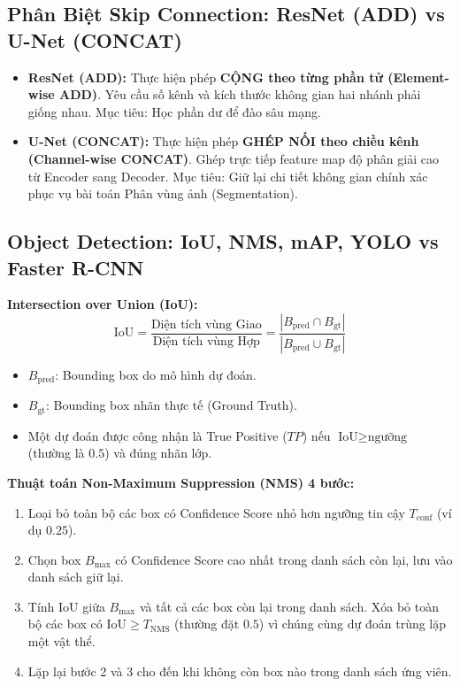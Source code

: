 \documentclass[10pt,a4paper]{article}
\begin{document}
\subsection{Phân Biệt Skip Connection: ResNet (ADD) vs U-Net (CONCAT)}
\begin{itemize}[leftmargin=*]
    \item \textbf{ResNet (ADD):} Thực hiện phép \textbf{CỘNG theo từng phần tử (Element-wise ADD)}. Yêu cầu số kênh và kích thước không gian hai nhánh phải giống nhau. Mục tiêu: Học phần dư để đào sâu mạng.
    \item \textbf{U-Net (CONCAT):} Thực hiện phép \textbf{GHÉP NỐI theo chiều kênh (Channel-wise CONCAT)}. Ghép trực tiếp feature map độ phân giải cao từ Encoder sang Decoder. Mục tiêu: Giữ lại chi tiết không gian chính xác phục vụ bài toán Phân vùng ảnh (Segmentation).
\end{itemize}

\subsection{Object Detection: IoU, NMS, mAP, YOLO vs Faster R-CNN}
\textbf{Intersection over Union (IoU):}
\begin{equation}
    \text{IoU} = \frac{\text{Diện tích vùng Giao}}{\text{Diện tích vùng Hợp}} = \frac{|B_{\text{pred}} \cap B_{\text{gt}}|}{|B_{\text{pred}} \cup B_{\text{gt}}|}
\end{equation}
\begin{itemize}[leftmargin=*]
    \item $B_{\text{pred}}$: Bounding box do mô hình dự đoán.
    \item $B_{\text{gt}}$: Bounding box nhãn thực tế (Ground Truth).
    \item Một dự đoán được công nhận là True Positive ($TP$) nếu $\text{IoU} \ge \text{ngưỡng}$ (thường là $0.5$) và đúng nhãn lớp.
\end{itemize}

\textbf{Thuật toán Non-Maximum Suppression (NMS) 4 bước:}
\begin{enumerate}[leftmargin=*]
    \item Loại bỏ toàn bộ các box có Confidence Score nhỏ hơn ngưỡng tin cậy $T_{\text{conf}}$ (ví dụ $0.25$).
    \item Chọn box $B_{\text{max}}$ có Confidence Score cao nhất trong danh sách còn lại, lưu vào danh sách giữ lại.
    \item Tính IoU giữa $B_{\text{max}}$ và tất cả các box còn lại trong danh sách. Xóa bỏ toàn bộ các box có $\text{IoU} \ge T_{\text{NMS}}$ (thường đặt $0.5$) vì chúng cùng dự đoán trùng lặp một vật thể.
    \item Lặp lại bước 2 và 3 cho đến khi không còn box nào trong danh sách ứng viên.
\end{enumerate}
\end{document}
